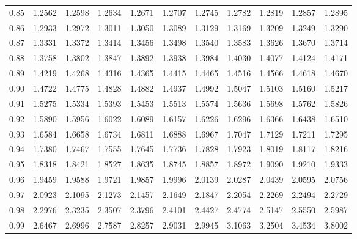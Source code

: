 \begin{center}
\begin{tabular}{r*{10}{r}}
		0.85 & 1.2562 & 1.2598 & 1.2634 & 1.2671 & 1.2707 & 1.2745 & 1.2782 & 1.2819 & 1.2857 & 1.2895 \\
		0.86 & 1.2933 & 1.2972 & 1.3011 & 1.3050 & 1.3089 & 1.3129 & 1.3169 & 1.3209 & 1.3249 & 1.3290 \\
		0.87 & 1.3331 & 1.3372 & 1.3414 & 1.3456 & 1.3498 & 1.3540 & 1.3583 & 1.3626 & 1.3670 & 1.3714 \\
		0.88 & 1.3758 & 1.3802 & 1.3847 & 1.3892 & 1.3938 & 1.3984 & 1.4030 & 1.4077 & 1.4124 & 1.4171 \\
		0.89 & 1.4219 & 1.4268 & 1.4316 & 1.4365 & 1.4415 & 1.4465 & 1.4516 & 1.4566 & 1.4618 & 1.4670 \\[5pt]
		0.90 & 1.4722 & 1.4775 & 1.4828 & 1.4882 & 1.4937 & 1.4992 & 1.5047 & 1.5103 & 1.5160 & 1.5217 \\
		0.91 & 1.5275 & 1.5334 & 1.5393 & 1.5453 & 1.5513 & 1.5574 & 1.5636 & 1.5698 & 1.5762 & 1.5826 \\
		0.92 & 1.5890 & 1.5956 & 1.6022 & 1.6089 & 1.6157 & 1.6226 & 1.6296 & 1.6366 & 1.6438 & 1.6510 \\
		0.93 & 1.6584 & 1.6658 & 1.6734 & 1.6811 & 1.6888 & 1.6967 & 1.7047 & 1.7129 & 1.7211 & 1.7295 \\
		0.94 & 1.7380 & 1.7467 & 1.7555 & 1.7645 & 1.7736 & 1.7828 & 1.7923 & 1.8019 & 1.8117 & 1.8216 \\
		0.95 & 1.8318 & 1.8421 & 1.8527 & 1.8635 & 1.8745 & 1.8857 & 1.8972 & 1.9090 & 1.9210 & 1.9333 \\
		0.96 & 1.9459 & 1.9588 & 1.9721 & 1.9857 & 1.9996 & 2.0139 & 2.0287 & 2.0439 & 2.0595 & 2.0756 \\
		0.97 & 2.0923 & 2.1095 & 2.1273 & 2.1457 & 2.1649 & 2.1847 & 2.2054 & 2.2269 & 2.2494 & 2.2729 \\
		0.98 & 2.2976 & 2.3235 & 2.3507 & 2.3796 & 2.4101 & 2.4427 & 2.4774 & 2.5147 & 2.5550 & 2.5987 \\
		0.99 & 2.6467 & 2.6996 & 2.7587 & 2.8257 & 2.9031 & 2.9945 & 3.1063 & 3.2504 & 3.4534 & 3.8002 \\
		\bottomrule
	\end{tabular}
\end{center}